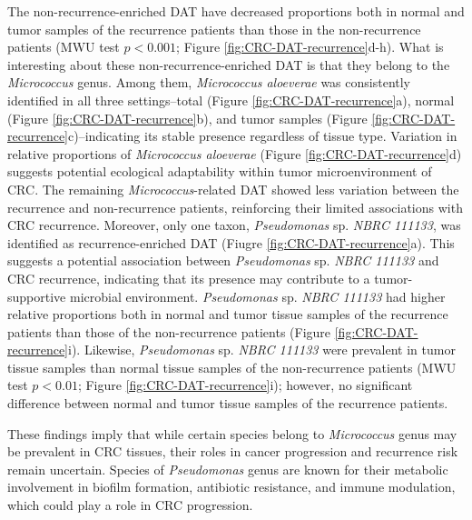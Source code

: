 \documentclass[11pt, a4paper, onecolumn, oneside]{report}
\begin{document}
                The non-recurrence-enriched DAT have decreased proportions both in normal and tumor samples of the recurrence patients than those in the non-recurrence patients (MWU test $p < 0.001$; Figure \ref{fig:CRC-DAT-recurrence}d-h). What is interesting about these non-recurrence-enriched DAT is that they belong to the \textit{Micrococcus} genus. Among them, \textit{Micrococcus aloeverae} was consistently identified in all three settings--total (Figure \ref{fig:CRC-DAT-recurrence}a), normal (Figure \ref{fig:CRC-DAT-recurrence}b), and tumor samples (Figure \ref{fig:CRC-DAT-recurrence}c)--indicating its stable presence regardless of tissue type. Variation in relative proportions of \textit{Micrococcus aloeverae} (Figure \ref{fig:CRC-DAT-recurrence}d) suggests potential ecological adaptability within tumor microenvironment of CRC. The remaining \textit{Micrococcus}-related DAT showed less variation between the recurrence and non-recurrence patients, reinforcing their limited associations with CRC recurrence. Moreover, only one taxon, \textit{Pseudomonas} sp. \textit{NBRC 111133}, was identified as recurrence-enriched DAT (Fiugre \ref{fig:CRC-DAT-recurrence}a). This suggests a potential association between \textit{Pseudomonas} sp. \textit{NBRC 111133} and CRC recurrence, indicating that its presence may contribute to a tumor-supportive microbial environment. \textit{Pseudomonas} sp. \textit{NBRC 111133} had higher relative proportions both in normal and tumor tissue samples of the recurrence patients than those of the non-recurrence patients (Figure \ref{fig:CRC-DAT-recurrence}i). Likewise, \textit{Pseudomonas} sp. \textit{NBRC 111133} were prevalent in tumor tissue samples than normal tissue samples of the non-recurrence patients (MWU test $p < 0.01$; Figure \ref{fig:CRC-DAT-recurrence}i); however, no significant difference between normal and tumor tissue samples of the recurrence patients.

                These findings imply that while certain species belong to \textit{Micrococcus} genus may be prevalent in CRC tissues, their roles in cancer progression and recurrence risk remain uncertain. Species of \textit{Pseudomonas} genus are known for their metabolic involvement in biofilm formation, antibiotic resistance, and immune modulation, which could play a role in CRC progression.
\end{document}
